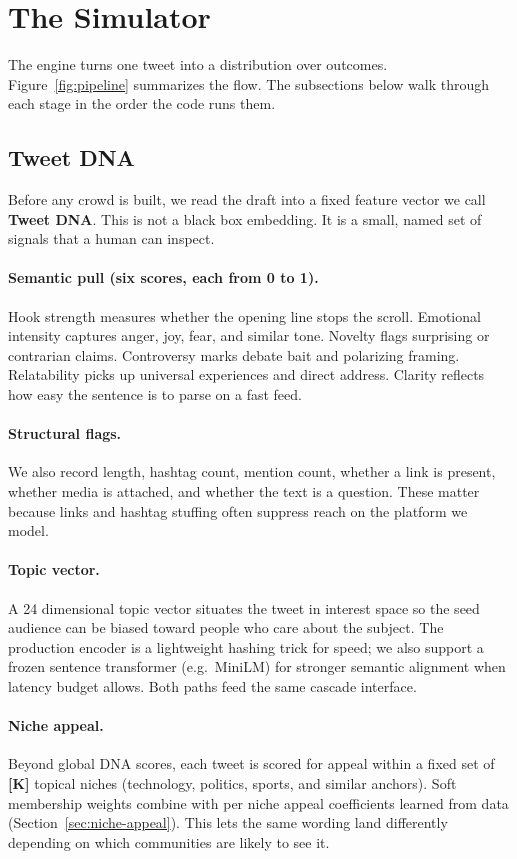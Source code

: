 \documentclass[11pt]{article}
\newcommand{\fill}[1]{\textbf{[#1]}}
\begin{document}
\section{The Simulator}

The engine turns one tweet into a distribution over outcomes. Figure~\ref{fig:pipeline}
summarizes the flow. The subsections below walk through each stage in the order
the code runs them.

\subsection{Tweet DNA}
Before any crowd is built, we read the draft into a fixed feature vector we call
\textbf{Tweet DNA}. This is not a black box embedding. It is a small, named set
of signals that a human can inspect.

\paragraph{Semantic pull (six scores, each from 0 to 1).}
Hook strength measures whether the opening line stops the scroll. Emotional
intensity captures anger, joy, fear, and similar tone. Novelty flags surprising
or contrarian claims. Controversy marks debate bait and polarizing framing.
Relatability picks up universal experiences and direct address. Clarity reflects
how easy the sentence is to parse on a fast feed.

\paragraph{Structural flags.}
We also record length, hashtag count, mention count, whether a link is present,
whether media is attached, and whether the text is a question. These matter
because links and hashtag stuffing often suppress reach on the platform we model.

\paragraph{Topic vector.}
A 24 dimensional topic vector situates the tweet in interest space so the seed
audience can be biased toward people who care about the subject. The production
encoder is a lightweight hashing trick for speed; we also support a frozen
sentence transformer (e.g.\ MiniLM) for stronger semantic alignment when latency
budget allows. Both paths feed the same cascade interface.

\paragraph{Niche appeal.}
Beyond global DNA scores, each tweet is scored for appeal within a fixed set of
\fill{K} topical niches (technology, politics, sports, and similar anchors).
Soft membership weights combine with per niche appeal coefficients learned from
data (Section~\ref{sec:niche-appeal}). This lets the same wording land differently
depending on which communities are likely to see it.
\end{document}
